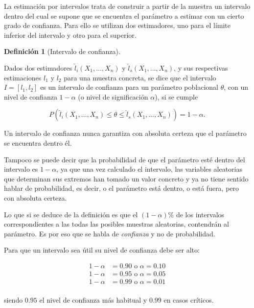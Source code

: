 \documentclass[
  a4paper,
]{scrreport}
\theoremstyle{plain}
\theoremstyle{definition}
\theoremstyle{definition}
\newtheorem{definition}{Definición}[chapter]
\theoremstyle{remark}
\begin{document}
La estimación por intervalos trata de construir a partir de la muestra
un intervalo dentro del cual se supone que se encuentra el parámetro a
estimar con un cierto grado de confianza. Para ello se utilizan dos
estimadores, uno para el límite inferior del intervalo y otro para el
superior.

\begin{definition}[Intervalo de
confianza]\protect\hypertarget{def-intervalo-confianza}{}\label{def-intervalo-confianza}

Dados dos estimadores \(\hat l_i(X_1,\ldots,X_n)\) y
\(\hat l_s(X_1,\ldots,X_n)\), y sus respectivas estimaciones \(l_1\) y
\(l_2\) para una muestra concreta, se dice que el intervalo
\(I=[l_1,l_2]\) es un intervalo de confianza para un parámetro
poblacional \(\theta\), con un nivel de confianza \(1-\alpha\) (o nivel
de significación \(\alpha\)), si se cumple

\[
P(\hat l_i(X_1,\ldots,X_n)\leq \theta \leq \hat l_s(X_1,\ldots,X_n))= 1-\alpha.
\]

\end{definition}

Un intervalo de confianza nunca garantiza con absoluta certeza que el
parámetro se encuentra dentro él.

Tampoco se puede decir que la probabilidad de que el parámetro esté
dentro del intervalo es \(1-\alpha\), ya que una vez calculado el
intervalo, las variables aleatorias que determinan sus extremos han
tomado un valor concreto y ya no tiene sentido hablar de probabilidad,
es decir, o el parámetro está dentro, o está fuera, pero con absoluta
certeza.

Lo que si se deduce de la definición es que el \((1-\alpha)\%\) de los
intervalos correspondientes a las todas las posibles muestras
aleatorias, contendrán al parámetro. Es por eso que se habla de
\emph{confianza} y no de probabilidad.

Para que un intervalo sea útil su nivel de confianza debe ser alto:

\begin{align*}
1-\alpha &= 0.90 \mbox{ o } \alpha=0.10\\
1-\alpha &= {0.95} \mbox{ o } \alpha=0.05\\
1-\alpha &= 0.99 \mbox{ o } \alpha=0.01\\
\end{align*}

siendo \(0.95\) el nivel de confianza más habitual y \(0.99\) en casos
críticos.
\end{document}
